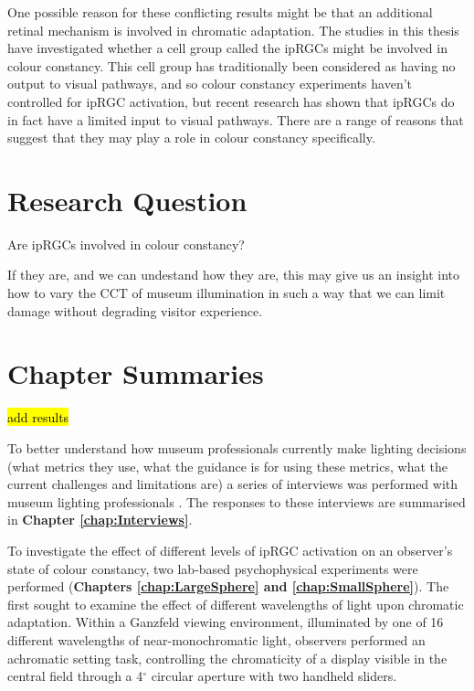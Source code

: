 One possible reason for these conflicting results might be that an additional retinal mechanism is involved in chromatic adaptation. The studies in this thesis have investigated whether a cell group called the \glspl{ipRGC} might be involved in colour constancy. This cell group has traditionally been considered as having no output to visual pathways, and so colour constancy experiments haven't controlled for \gls{ipRGC} activation, but recent research has shown that \glspl{ipRGC} do in fact have a limited input to visual pathways. There are a range of reasons that suggest that they may play a role in colour constancy specifically.

\section{Research Question}

Are ipRGCs involved in colour constancy?

If they are, and we can undestand how they are, this may give us an insight into how to vary the \gls{CCT} of museum illumination in such a way that we can limit damage without degrading visitor experience.

\section{Chapter Summaries}

\hl{add results} 

To better understand how museum professionals currently make lighting decisions (what metrics they use, what the guidance is for using these metrics, what the current challenges and limitations are) a series of interviews was performed with museum lighting professionals \citep{garside_how_2017}. The responses to these interviews are summarised in \textbf{Chapter \ref{chap:Interviews}}.

To investigate the effect of different levels of \gls{ipRGC} activation on an observer's state of colour constancy, two lab-based psychophysical experiments were performed (\textbf{Chapters \ref{chap:LargeSphere} and \ref{chap:SmallSphere}}). The first sought to examine the effect of different wavelengths of light upon chromatic adaptation. Within a Ganzfeld viewing environment, illuminated by one of 16 different wavelengths of near-monochromatic light, observers performed an achromatic setting task, controlling the chromaticity of a display visible in the central field through a 4$^{\circ}$ circular aperture with two handheld sliders.

